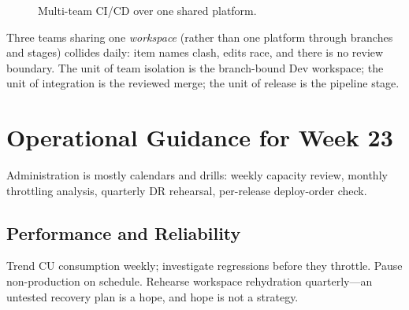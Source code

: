 \begin{figure}[H]
    \centering
    \caption{Multi-team CI/CD over one shared platform.}
    \label{fig:chapter23-cicd}
\end{figure}

\begin{pitfall}
Three teams sharing one \emph{workspace} (rather than one platform through branches and stages) collides daily: item names clash, edits race, and there is no review boundary. The unit of team isolation is the branch-bound Dev workspace; the unit of integration is the reviewed merge; the unit of release is the pipeline stage.
\end{pitfall}

\section{Operational Guidance for Week 23}
Administration is mostly calendars and drills: weekly capacity review, monthly throttling analysis, quarterly DR rehearsal, per-release deploy-order check.

\subsection{Performance and Reliability}
Trend CU consumption weekly; investigate regressions before they throttle. Pause non-production on schedule. Rehearse workspace rehydration quarterly---an untested recovery plan is a hope, and hope is not a strategy.


